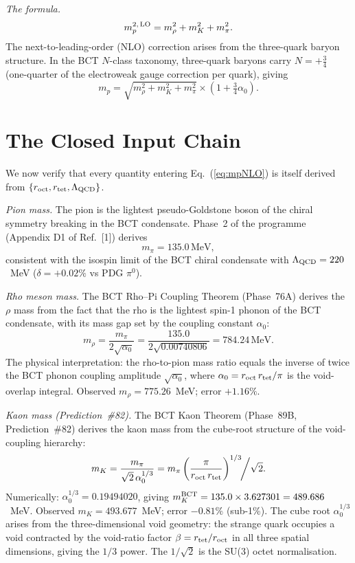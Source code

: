 \documentclass[10pt,twocolumn]{article}
\begin{document}
\textit{The formula.}
\begin{equation}
m_p^{2,\,\rm LO} = m_\rho^2 + m_K^2 + m_\pi^2.
\label{eq:Pyth}
\end{equation}
The next-to-leading-order (NLO) correction arises from the three-quark baryon structure. In the
BCT $N$-class taxonomy, three-quark baryons carry $N = +\tfrac{3}{4}$ (one-quarter of the
electroweak gauge correction per quark), giving
\begin{equation}
m_p = \sqrt{m_\rho^2 + m_K^2 + m_\pi^2}
      \times \left(1 + \tfrac{3}{4}\alpha_0\right).
\label{eq:mpNLO}
\end{equation}

\section{The Closed Input Chain}

We now verify that every quantity entering Eq.~(\ref{eq:mpNLO}) is itself derived from
$\{r_{\rm oct}, r_{\rm tet}, \Lambda_{\rm QCD}\}$.

\textit{Pion mass.} The pion is the lightest pseudo-Goldstone boson of the chiral symmetry
breaking in the BCT condensate. Phase~2 of the programme (Appendix D1 of Ref.~[1]) derives
\begin{equation}
m_\pi = 135.0\,\text{MeV},
\label{eq:mpi}
\end{equation}
consistent with the isospin limit of the BCT chiral condensate with $\Lambda_{\rm QCD} = 220$~MeV
($\delta = +0.02\%$ vs PDG $\pi^0$).

\textit{Rho meson mass.} The BCT Rho--Pi Coupling Theorem (Phase~76A) derives the $\rho$ mass
from the fact that the rho is the lightest spin-1 phonon of the BCT condensate, with its mass
gap set by the coupling constant $\alpha_0$:
\begin{equation}
m_\rho = \frac{m_\pi}{2\sqrt{\alpha_0}}
       = \frac{135.0}{2\sqrt{0.00740806}}
       = 784.24\,\text{MeV}.
\label{eq:mrho}
\end{equation}
The physical interpretation: the rho-to-pion mass ratio equals the inverse of twice the BCT
phonon coupling amplitude $\sqrt{\alpha_0}$, where $\alpha_0 = r_{\rm oct}\,r_{\rm tet}/\pi$
is the void-overlap integral. Observed $m_\rho = 775.26$~MeV; error $+1.16\%$.

\textit{Kaon mass (Prediction~\#82).} The BCT Kaon Theorem (Phase~89B, Prediction~\#82)
derives the kaon mass from the cube-root structure of the void-coupling hierarchy:
\begin{equation}
m_K = \frac{m_\pi}{\sqrt{2}\,\alpha_0^{1/3}}
    = m_\pi \left(\frac{\pi}{r_{\rm oct}\,r_{\rm tet}}\right)^{1/3}\!\!\bigg/\sqrt{2}.
\label{eq:mK}
\end{equation}
Numerically: $\alpha_0^{1/3} = 0.19494020$, giving
$m_K^{\rm BCT} = 135.0 \times 3.627301 = 489.686$~MeV.
Observed $m_K = 493.677$~MeV; error $-0.81\%$ (sub-1\%). The cube root $\alpha_0^{1/3}$ arises
from the three-dimensional void geometry: the strange quark occupies a void contracted by the
void-ratio factor $\beta = r_{\rm tet}/r_{\rm oct}$ in all three spatial dimensions, giving the
$1/3$ power. The $1/\sqrt{2}$ is the SU(3) octet normalisation.
\end{document}
